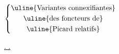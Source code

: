 
$\left\{\begin{gathered} \text{\uline{Variantes connexifiantes}}\\ \text{\uline{des foncteurs de}}\\ \text{\uline{Picard relatifs}} \end{gathered}\right.$

\uline{. .}

